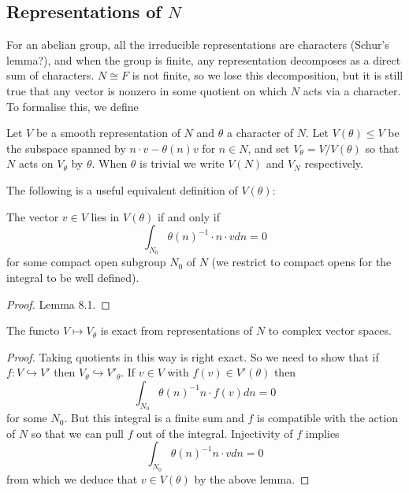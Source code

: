 \subsection{Representations of $N$}

For an abelian group, all the irreducible representations are characters (Schur's lemma?), and when the group is finite, any representation decomposes as a direct sum of characters. $N \cong F$ is not finite, so we lose this decomposition, but it is still true that any vector is nonzero in some quotient on which $N$ acts via a character. To formalise this, we define

\begin{notn}
    Let $V$ be a smooth representation of $N$ and $\theta$ a character of $N$. Let $V(\theta) \leq V$ be the subspace spanned by $n\cdot v - \theta(n)v$ for $n\in N$, and set $V_\theta = V/V(\theta)$ so that $N$ acts on $V_\theta$ by $\theta$. When $\theta$ is trivial we write $V(N)$ and $V_N$ respectively. 
\end{notn}

The following is a useful equivalent definition of $V(\theta)$:

\begin{lemma}\label{criteria N}
    The vector $v \in V$ lies in $V(\theta)$ if and only if 
    $$\int_{N_0} \theta(n)^{-1} \cdot n \cdot v dn = 0$$
    for some compact open subgroup $N_0$ of $N$ (we restrict to compact opens for the integral to be well defined).
\end{lemma}
\begin{proof}
    \cite{BH1} Lemma 8.1.
\end{proof}

\begin{cor}
    The functo $V \mapsto V_\theta$ is exact from representations of $N$ to complex vector spaces.
\end{cor}
\begin{proof}
    Taking quotients in this way is right exact. So we need to show that if $f: V \hookrightarrow V'$ then $V_\theta \hookrightarrow V'_\theta$. If $v \in V$ with $f(v) \in V'(\theta)$ then 
    $$\int_{N_0} \theta(n)^{-1}n \cdot f(v) dn = 0$$
    for some $N_0$. But this integral is a finite sum and $f$ is compatible with the action of $N$ so that we can pull $f$ out of the integral. Injectivity of $f$ implies
    $$\int_{N_0} \theta(n)^{-1}n \cdot v dn = 0$$
    from which we deduce that $v \in V(\theta)$ by the above lemma.
\end{proof}

